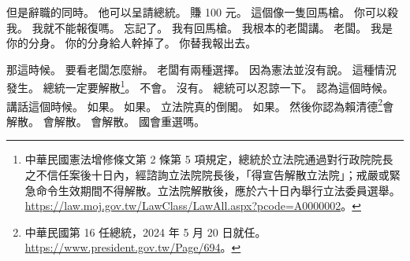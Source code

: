 \hypertarget{c01:cue:1307}{}但是辭職的同時。
\hypertarget{c01:cue:1308}{}他可以呈請總統。
\hypertarget{c01:cue:1309}{}賺 100 元。
\hypertarget{c01:cue:1310}{}這個像一隻回馬槍。
\hypertarget{c01:cue:1311}{}你可以殺我。
\hypertarget{c01:cue:1312}{}我就不能報復嗎。
\hypertarget{c01:cue:1313}{}忘記了。
\hypertarget{c01:cue:1314}{}我有回馬槍。
\hypertarget{c01:cue:1315}{}我根本的老闆講。
\hypertarget{c01:cue:1316}{}老闆。
\hypertarget{c01:cue:1317}{}我是你的分身。
\hypertarget{c01:cue:1318}{}你的分身給人幹掉了。
\hypertarget{c01:cue:1319}{}你替我報出去。

\hypertarget{c01:cue:1320}{}那這時候。
\hypertarget{c01:cue:1321}{}要看老闆怎麼辦。
\hypertarget{c01:cue:1322}{}老闆有兩種選擇。
\hypertarget{c01:cue:1323}{}因為憲法並沒有說。
\hypertarget{c01:cue:1324}{}這種情況發生。
\hypertarget{c01:cue:1325}{}總統一定要解散\footnote{中華民國憲法增修條文第 2 條第 5 項規定，總統於立法院通過對行政院院長之不信任案後十日內，經諮詢立法院院長後，「得宣告解散立法院」；戒嚴或緊急命令生效期間不得解散。立法院解散後，應於六十日內舉行立法委員選舉。\url{https://law.moj.gov.tw/LawClass/LawAll.aspx?pcode=A0000002}。}。
\hypertarget{c01:cue:1326}{}不會。
\hypertarget{c01:cue:1327}{}沒有。
\hypertarget{c01:cue:1328}{}總統可以忍諒一下。
\hypertarget{c01:cue:1329}{}認為這個時候。
\hypertarget{c01:cue:1330}{}講話這個時候。
\hypertarget{c01:cue:1331}{}如果。
\hypertarget{c01:cue:1332}{}如果。
\hypertarget{c01:cue:1333}{}立法院真的倒閣。
\hypertarget{c01:cue:1334}{}如果。
\hypertarget{c01:cue:1335}{}然後你認為賴清德\footnote{中華民國第 16 任總統，2024 年 5 月 20 日就任。\url{https://www.president.gov.tw/Page/694}。}會解散。
\hypertarget{c01:cue:1336}{}會解散。
\hypertarget{c01:cue:1337}{}會解散。
\hypertarget{c01:cue:1338}{}國會重選嗎。

